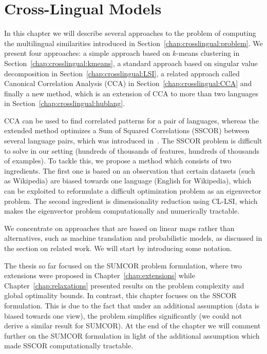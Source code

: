 \section{Cross-Lingual Models}\label{chap:crosslingual:models}
In this chapter we will describe several approaches to the problem of computing the
multilingual similarities introduced in Section~\ref{chap:crosslingual:problem}. We present four approaches:
a simple approach based on $k$-means clustering in Section~\ref{chap:crosslingual:kmeans}, a standard approach
based on singular value decomposition in Section~\ref{chap:crosslingual:LSI}, a related
approach called Canonical Correlation Analysis (CCA) in Section~\ref{chap:crosslingual:CCA} and finally a
new method, which is an extension of CCA to more than two languages in Section~\ref{chap:crosslingual:hublang}.

CCA can be used to find correlated patterns for a pair of languages, whereas the extended method
optimizes a Sum of Squared Correlations (SSCOR) between several language pairs, which was introduced
in~\cite{Kettenring}. The SSCOR problem is difficult to solve in our setting (hundreds of thousands
of features, hundreds of thousands of examples). To tackle this, we propose a method which consists
of two ingredients. The first one is based on an observation that certain datasets (such as Wikipedia)
are biased towards one language (English for Wikipedia), which can be exploited to reformulate a
difficult optimization problem as an eigenvector problem. The second ingredient is dimensionality
reduction using CL-LSI, which makes the eigenvector problem computationally and numerically tractable.

We concentrate on approaches that are based on linear maps rather than alternatives, such as machine
translation and probabilistic models, as discussed in the section on related work. We will start
by introducing some notation.

The thesis so far focused on the SUMCOR problem formulation, where two extensions were proposed in Chapter~\ref{chap:extensions} while
Chapter~\ref{chap:relaxations} presented results on the problem complexity and global optimality bounds. In contrast, this chapter focuses
on the SSCOR formulation. This is due to the fact that under an additional assumption (data is biased towards one view), 
the problem simplifies significantly (we could not derive a similar result for SUMCOR). At the end of the chapter we will comment further
on the SUMCOR formulation in light of the additional assumption which made SSCOR computationally tractable.

